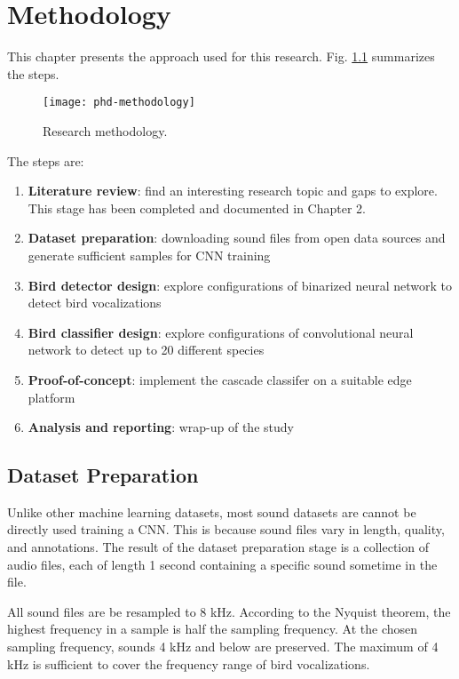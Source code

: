 
\chapter{Methodology}

This chapter presents the approach used for this research.
 Fig. \ref{phd-methodology} summarizes the steps.

\begin{figure}[h]
\centering
\texttt{[image: phd-methodology]}
\caption{Research methodology.}
\label{phd-methodology}
\end{figure}

The steps are:
\begin{enumerate}
    \item \textbf{Literature review}: find an interesting research topic and gaps to explore. This stage has been completed and documented in Chapter 2.
    \item \textbf{Dataset preparation}: downloading sound files from open data sources and generate sufficient samples for CNN training
    \item \textbf{Bird detector design}: explore configurations of binarized neural network to detect bird vocalizations
    \item \textbf{Bird classifier design}: explore configurations of convolutional neural network to detect up to 20 different species
    \item \textbf{Proof-of-concept}: implement the cascade classifer on a suitable edge platform
    \item \textbf{Analysis and reporting}: wrap-up of the study
\end{enumerate}

\section{Dataset Preparation}

Unlike other machine learning datasets, most sound datasets are cannot be directly used training a CNN. This is because sound files vary in length, quality, and annotations.
The result of the dataset preparation stage is a collection of audio files, each of length 1 second containing a specific sound sometime in the file.

All sound files are be resampled to 8 kHz. According to the Nyquist theorem, the highest frequency in a sample is half the sampling frequency. At the chosen sampling frequency, sounds 4 kHz and below are preserved. The maximum of 4 kHz is sufficient to cover the frequency range of bird vocalizations.

